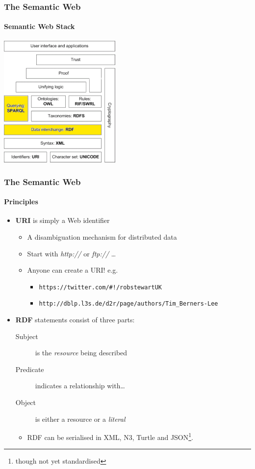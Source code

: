 \documentclass{beamer}
\begin{document}
\begin{frame}
\frametitle{The Semantic Web}
\framesubtitle{Semantic Web Stack}

\begin{center}
\includegraphics[width=60mm]{images/sw-stack-colour.pdf}
\end{center}

\end{frame}


\begin{frame}[fragile]
\frametitle{The Semantic Web}
\framesubtitle{Principles}

\begin{itemize}
\item \textbf{URI} is simply a Web identifier

  \begin{itemize}
  \item A disambiguation mechanism for distributed data
  \item Start with \emph{http://} or \emph{ftp://} \ldots
  \item Anyone can create a URI! e.g.

    \begin{itemize}
    \item \texttt{https://twitter.com/\#!/robstewartUK}
    \item \texttt{http://dblp.l3s.de/d2r/page/authors/Tim\_Berners-Lee} 
    \end{itemize}
  \end{itemize}

\pause

\item \textbf{RDF} statements consist of three parts:
  
  \begin{description}
  \item[Subject] is the \emph{resource} being described
  \item[Predicate] indicates a relationship with\ldots
  \item[Object] is either a resource or a \emph{literal}
  \end{description}
  
  \begin{itemize}
  \item RDF can be serialised in XML, N3, Turtle and
    JSON\footnote{though not yet standardised}.
  \end{itemize}
  
\end{itemize}

\end{frame}
\end{document}
